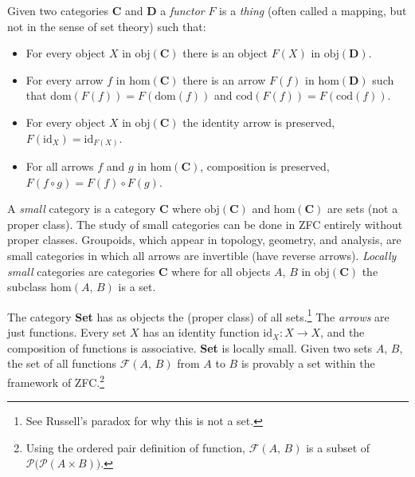 \documentclass{article}
\theoremstyle{plain}
\theoremstyle{normal}
\newenvironment{example}{%
    \pushQED{\qed}\renewcommand{\qedsymbol}{$\blacksquare$}\examplex%
}{%
    \popQED\endexamplex%
}
\begin{document}
            Given two categories $\mathbf{C}$ and $\mathbf{D}$ a
            \textit{functor} $F$ is a \textit{thing} (often called a mapping,
            but not in the sense of set theory) such that:%
            \begin{itemize}
                \item For every object $X$ in $\textrm{obj}(\mathbf{C})$
                    there is an object $F(X)$ in $\textrm{obj}(\mathbf{D})$.
                \item For every arrow $f$ in $\textrm{hom}(\mathbf{C})$ there
                    is an arrow $F(f)$ in $\textrm{hom}(\mathbf{D})$ such that
                    $\textrm{dom}(F(f))=F(\textrm{dom}(f))$ and
                    $\textrm{cod}(F(f))=F(\textrm{cod}(f))$.
                \item For every object $X$ in $\textrm{obj}(\mathbf{C})$ the
                    identity arrow is preserved,
                    $F(\textrm{id}_{X})=\textrm{id}_{F(X)}$.
                \item For all arrows $f$ and $g$ in $\textrm{hom}(\mathbf{C})$,
                    composition is preserved, $F(f\circ{g})=F(f)\circ{F}(g)$.
            \end{itemize}
            A \textit{small} category%
            is a category $\mathbf{C}$ where
            $\textrm{obj}(\mathbf{C})$ and $\textrm{hom}(\mathbf{C})$ are sets
            (not a proper class). The study of small categories can be done in
            ZFC entirely without proper classes. Groupoids, which appear in
            topology, geometry, and analysis, are small categories in which all
            arrows are invertible (have reverse arrows).
            \textit{Locally small} categories are categories $\mathbf{C}$ where
            for all objects $A,\,B$ in $\textrm{obj}(\mathbf{C})$ the
            subclass $\textrm{hom}(A,\,B)$ is a set.%
            \begin{example}
                The category \textbf{Set} has as objects the (proper class) of
                all sets.\footnote{%
                    See Russell's paradox for why this is not a set.%
                }
                The \textit{arrows} are just functions. Every set $X$ has an
                identity function $\textrm{id}_{X}:X\rightarrow{X}$, and the
                composition of functions is associative. \textbf{Set} is
                locally small. Given two sets $A,\,B$, the set of all functions
                $\mathcal{F}(A,\,B)$ from $A$ to $B$ is provably a set within
                the framework of ZFC.\footnote{%
                    Using the ordered pair definition of function,
                    $\mathcal{F}(A,\,B)$ is a
                    subset of $\mathcal{P}\big(\mathcal{P}(A\times{B})\big)$.
                }
            \end{example}
\end{document}
